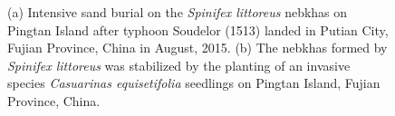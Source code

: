 \documentclass[]{interact}
\theoremstyle{plain}%
\theoremstyle{definition}
\theoremstyle{remark}
\begin{document}
\begin{figure}
  \centering
  \hspace{5pt}
  \caption{(a) Intensive sand burial on the \textit{Spinifex littoreus} nebkhas on Pingtan Island after typhoon Soudelor (1513) landed in Putian City, Fujian Province, China in August, 2015. (b) The nebkhas formed by \textit{Spinifex littoreus} was stabilized by the planting of an invasive species \textit{Casuarinas equisetifolia} seedlings on Pingtan Island, Fujian Province, China.} 
  \label{fig:sample-pic}
\end{figure}
\end{document}
